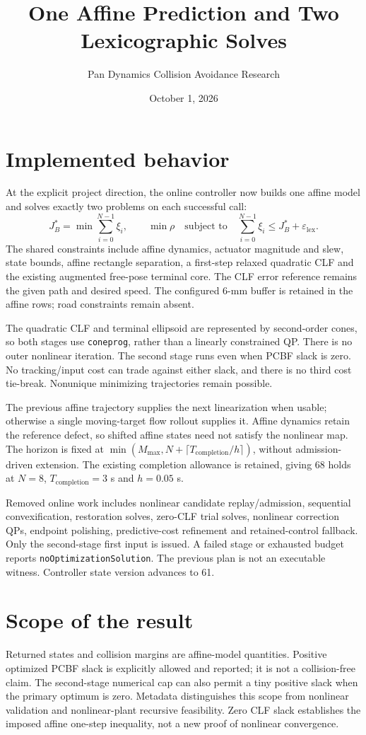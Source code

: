 \documentclass[11pt]{article}
\title{One Affine Prediction and Two Lexicographic Solves}
\author{Pan Dynamics Collision Avoidance Research}
\date{October 1, 2026}
\begin{document}
\maketitle

\section{Implemented behavior}
At the explicit project direction, the online controller now builds one affine
model and solves exactly two problems on each successful call:
\[
 J_B^*=\min\sum_{i=0}^{N-1}\xi_i,\qquad
 \min\rho\quad\text{subject to}\quad\sum_{i=0}^{N-1}\xi_i
 \le J_B^*+\varepsilon_{\mathrm{lex}}.
\]
The shared constraints include affine dynamics, actuator magnitude and slew,
state bounds, affine rectangle separation, a first-step relaxed quadratic CLF
and the existing augmented free-pose terminal core. The CLF error reference
remains the given path and desired speed. The configured 6-mm buffer is
retained in the affine rows; road constraints remain absent.

The quadratic CLF and terminal ellipsoid are represented by second-order
cones, so both stages use \texttt{coneprog}, rather than a linearly constrained
QP. There is no outer nonlinear iteration. The second stage runs even when
PCBF slack is zero. No tracking/input cost can trade against either slack,
and there is no third cost tie-break. Nonunique minimizing trajectories remain
possible.

The previous affine trajectory supplies the next linearization when usable;
otherwise a single moving-target flow rollout supplies it. Affine dynamics
retain the reference defect, so shifted affine states need not satisfy the
nonlinear map. The horizon is fixed at
$\min(M_{\max},N+\lceil T_{\mathrm{completion}}/h\rceil)$, without admission-driven
extension. The existing completion allowance is retained, giving 68 holds at
$N=8$, $T_{\mathrm{completion}}=3$ s and $h=0.05$ s.

Removed online work includes nonlinear candidate replay/admission, sequential
convexification, restoration solves, zero-CLF trial solves, nonlinear correction
QPs, endpoint polishing, predictive-cost refinement and retained-control
fallback. Only the second-stage first input is issued. A failed stage or
exhausted budget reports \texttt{noOptimizationSolution}. The previous plan is
not an executable witness. Controller state version advances to 61.

\section{Scope of the result}
Returned states and collision margins are affine-model quantities. Positive
optimized PCBF slack is explicitly allowed and reported; it is not a
collision-free claim. The second-stage numerical cap can also permit a tiny
positive slack when the primary optimum is zero. Metadata distinguishes this
scope from nonlinear validation and nonlinear-plant recursive feasibility.
Zero CLF slack establishes the imposed affine one-step inequality, not a new
proof of nonlinear convergence.
\end{document}
